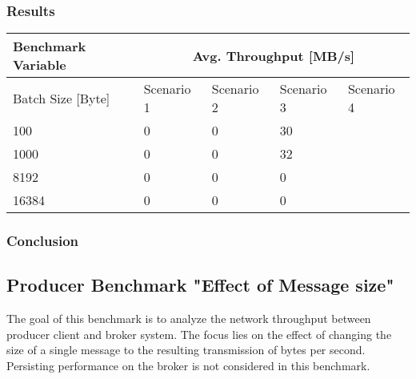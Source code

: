 \subsubsection{Results}
\begin{table}[H]
\centering
\begin{tabular}{|l|l|l|l|l|}
\hline
{\bf Benchmark Variable} & \multicolumn{4}{c|}{{\bf Avg. Throughput {[}MB/s{]}}} \\ \hline
Batch Size [Byte]        & Scenario 1       & Scenario 2       & Scenario 3   & Scenario 4   \\ \hline
100                      & 0                & 0                & 30   &           \\ \hline
1000                     & 0                & 0                & 32   &           \\ \hline
8192                     & 0                & 0                & 0    &           \\ \hline
16384                    & 0                & 0                & 0    &           \\ \hline
\end{tabular}
\end{table}

\subsubsection{Conclusion}


\subsection{Producer Benchmark "Effect of Message size"}
The goal of this benchmark is to analyze the network throughput between
producer client and broker system. The focus lies on the effect of changing the
size of a single message to the resulting transmission of bytes per
second. Persisting performance on the broker is not considered in
this benchmark.

